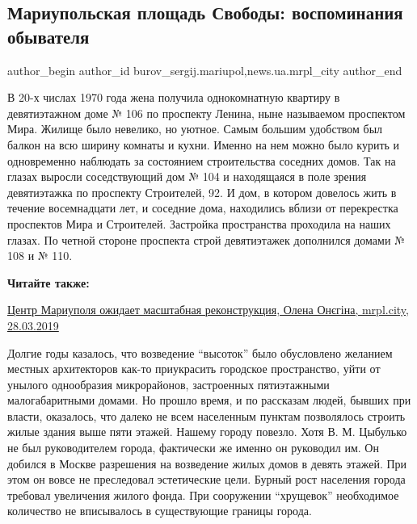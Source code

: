  
 
 
 
 
 
\subsection{Мариупольская площадь Свободы: воспоминания обывателя}
\label{sec:20_04_2019.stz.news.ua.mrpl_city.1.mariupol_ploschad_svobody_vospominania_obyvatelja}
 
\ifcmt
 author_begin
   author_id burov_sergij.mariupol,news.ua.mrpl_city
 author_end
\fi


В 20-х числах 1970 года жена получила однокомнатную квартиру в девятиэтажном
доме № 106 по проспекту Ленина, ныне называемом проспектом Мира. Жилище было
невелико, но уютное. Самым большим удобством был балкон на всю ширину комнаты и
кухни. Именно на нем можно было курить и одновременно наблюдать за состоянием
строительства соседних домов. Так на глазах выросли соседствующий дом № 104 и
находящаяся в поле зрения девятиэтажка по проспекту Строителей, 92. И дом, в
котором довелось жить в течение восемнадцати лет, и соседние дома, находились
вблизи от перекрестка проспектов Мира и Строителей. Застройка пространства
проходила на наших глазах. По четной стороне проспекта строй девятиэтажек
дополнился домами № 108 и № 110.

\textbf{Читайте также:} 

\href{https://mrpl.city/news/view/tsentr-mariupolya-ozhidaet-masshtabnaya-rekonstruktsiya-foto-plusvideo}{Центр Мариуполя ожидает масштабная реконструкция, Олена Онєгіна, mrpl.city, 28.03.2019}

Долгие годы казалось, что возведение \enquote{высоток} было обусловлено желанием
местных архитекторов как-то приукрасить городское пространство, уйти от унылого
однообразия микрорайонов, застроенных пятиэтажными малогабаритными домами. Но
прошло время, и по рассказам людей, бывших при власти, оказалось, что далеко не
всем населенным пунктам позволялось строить жилые здания выше пяти этажей.
Нашему городу повезло. Хотя В. М. Цыбулько не был руководителем города,
фактически же именно он руководил им. Он добился в Москве разрешения на
возведение жилых домов в девять этажей. При этом он вовсе не преследовал
эстетические цели. Бурный рост населения города требовал увеличения жилого
фонда. При сооружении \enquote{хрущевок} необходимое количество не вписывалось в
существующие границы города. 

